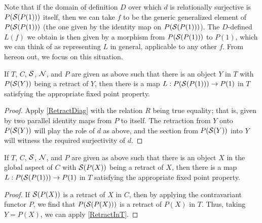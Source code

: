 \begin{corollary}\label{RetractDiag}
Note that if the domain of definition $D$ over which $d$ is relationally surjective is $P(\mathcal{S}(P(1)))$ itself, then we can take $f$ to be the generic generalized element of $P(\mathcal{S}(P(1)))$ (the one given by the identity map on $P(\mathcal{S}(P(1)))$). The $D$-defined $L(f)$ we obtain is then given by a morphism from $P(\mathcal{S}(P(1)))$ to $P(1)$, which we can think of as representing $L$ in general, applicable to any other $f$. From hereon out, we focus on this situation. 
\end{corollary}

\begin{corollary}\label{RetractInT}
If $T$, $C$, $\mathcal{S}$, $\mathcal{N}$, and $P$ are given as above such that there is an object $Y$ in $T$ with $P(\mathcal{S}(Y))$ being a retract of $Y$, then there is a map $L : P(\mathcal{S}(P(1))) \to P(1)$ in $T$ satisfying the appropriate fixed point property.
\end{corollary}
\begin{proof}
Apply \cref{RetractDiag} with the relation $R$ being true equality; that is, given by two parallel identity maps from $P$ to itself. The retraction from $Y$ onto $P(\mathcal{S}(Y))$ will play the role of $d$ as above, and the section from $P(\mathcal{S}(Y))$ into $Y$ will witness the required surjectivity of $d$.
\end{proof}

\begin{corollary}\label{RetractInC}
If $T$, $C$, $\mathcal{S}$, $\mathcal{N}$, and $P$ are given as above such that there is an object $X$ in the global aspect of $C$ with $\mathcal{S}(P(X))$ being a retract of $X$, then there is a map $L : P(\mathcal{S}(P(1))) \to P(1)$ in $T$ satisfying the appropriate fixed point property.
\end{corollary}
\begin{proof}
If $\mathcal{S}(P(X))$ is a retract of $X$ in $C$, then by applying the contravariant functor $P$, we find that $P(\mathcal{S}(P(X)))$ is a retract of $P(X)$ in $T$. Thus, taking $Y = P(X)$, we can apply \cref{RetractInT}.
\end{proof}

